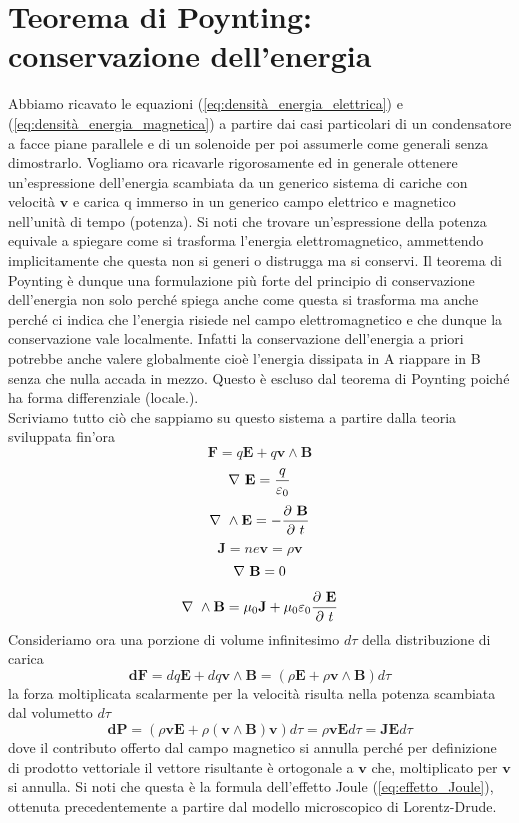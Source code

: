 \documentclass[
10pt, %
a4paper, %
oneside, %
headinclude,footinclude, %
BCOR5mm, %
]{scrartcl}
\begin{document}
\section{Teorema di Poynting: conservazione dell'energia}
Abbiamo ricavato le equazioni (\ref{eq:densità_energia_elettrica}) e (\ref{eq:densità_energia_magnetica}) a partire dai casi particolari di un condensatore a facce piane parallele e di un solenoide per poi assumerle come generali senza dimostrarlo. Vogliamo ora ricavarle rigorosamente ed in generale ottenere un'espressione dell'energia scambiata da un generico sistema di cariche con velocità \(\mathbf{v}\) e carica q immerso in un generico campo elettrico e magnetico nell'unità di tempo (potenza). Si noti che trovare un'espressione della potenza equivale a spiegare come si trasforma l'energia elettromagnetico, ammettendo implicitamente che questa non si generi o distrugga ma si conservi. Il teorema di Poynting è dunque una formulazione più forte del principio di conservazione dell'energia non solo perché spiega anche come questa si trasforma ma anche perché ci indica che l'energia risiede nel campo elettromagnetico e che dunque la conservazione vale localmente. Infatti la conservazione dell'energia a priori potrebbe anche valere globalmente cioè l'energia dissipata in A riappare in B senza che nulla accada in mezzo. Questo è escluso dal teorema di Poynting poiché ha forma differenziale (locale.).\\
Scriviamo tutto ciò che sappiamo su questo sistema a partire dalla teoria sviluppata fin'ora
\[\mathbf{F} = q\mathbf{E}+q\mathbf{v}\wedge\mathbf{B}\]
\[\nabla\ \mathbf{E} = \frac{q}{\varepsilon_0}\]
\[\nabla\ \wedge\mathbf{E} = -\frac{\partial\  \mathbf{B}}{\partial\  t}\]
\[\mathbf{J} = n e \mathbf{v} = \rho \mathbf{v}\]
\[\nabla\ \mathbf{B} = 0\]
\[\nabla\ \wedge\mathbf{B} = \mu_0\mathbf{J}+\mu_0\varepsilon_0\frac{\partial\ \mathbf{E}}{\partial\  t}\]
Consideriamo ora una porzione di volume infinitesimo \(d\tau\) della distribuzione di carica
\[\mathbf{dF} = dq\mathbf{E} + dq\mathbf{v}\wedge\mathbf{B} = (\rho\mathbf{E} + \rho \mathbf{v}\wedge\mathbf{B})d\tau\]
la forza moltiplicata scalarmente per la velocità risulta nella potenza scambiata dal volumetto $d\tau$
\[\mathbf{dP} = (\rho\mathbf{v}\mathbf{E} + \rho (\mathbf{v}\wedge\mathbf{B})\mathbf{v})d\tau =  \rho\mathbf{v}\mathbf{E}d\tau = \mathbf{J}\mathbf{E}d\tau\]
dove il contributo offerto dal campo magnetico si annulla perché per definizione di prodotto vettoriale il vettore risultante è ortogonale a \(\mathbf{v}\) che, moltiplicato per \(\mathbf{v}\) si annulla. Si noti che questa è la formula dell'effetto Joule (\ref{eq:effetto_Joule}), ottenuta precedentemente a partire dal modello microscopico di Lorentz-Drude.\\
\end{document}
